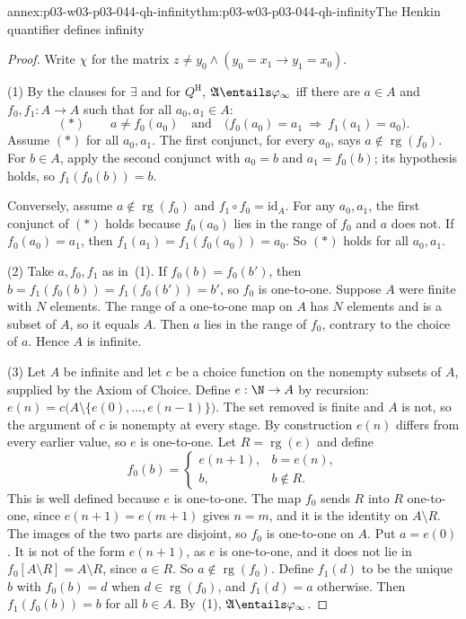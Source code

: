 \begin{annexitem}{annex:p03-w03-p03-044-qh-infinity}{thm:p03-w03-p03-044-qh-infinity}{The Henkin quantifier defines infinity}
\begin{proof}
Write \(\chi\) for the matrix
\(z\neq y_0\land(y_0=x_1\to y_1=x_0)\).

(1) By the clauses for \(\exists\) and for \(Q^{\mathrm H}\),
\(\mathfrak A\entails\varphi_\infty\) iff there are \(a\in A\) and
\(f_0,f_1:A\to A\) such that for all \(a_0,a_1\in A\):
\[
 (\ast)\qquad a\neq f_0(a_0)\quad\text{and}\quad
 \bigl(f_0(a_0)=a_1\ \Rightarrow\ f_1(a_1)=a_0\bigr).
\]
Assume \((\ast)\) for all \(a_0,a_1\).  The first conjunct, for every
\(a_0\), says \(a\notin\operatorname{rg}(f_0)\).  For \(b\in A\), apply
the second conjunct with \(a_0=b\) and \(a_1=f_0(b)\); its hypothesis holds,
so \(f_1(f_0(b))=b\).

Conversely, assume \(a\notin\operatorname{rg}(f_0)\) and \(f_1\circ
f_0=\mathrm{id}_A\).  For any \(a_0,a_1\), the first conjunct of \((\ast)\)
holds because \(f_0(a_0)\) lies in the range of \(f_0\) and \(a\) does not.
If \(f_0(a_0)=a_1\), then \(f_1(a_1)=f_1(f_0(a_0))=a_0\).  So \((\ast)\)
holds for all \(a_0,a_1\).

(2) Take \(a,f_0,f_1\) as in~(1).  If \(f_0(b)=f_0(b')\), then
\(b=f_1(f_0(b))=f_1(f_0(b'))=b'\), so \(f_0\) is one-to-one.  Suppose \(A\)
were finite with \(N\) elements.  The range of a one-to-one map on \(A\) has
\(N\) elements and is a subset of \(A\), so it equals \(A\).  Then \(a\) lies
in the range of \(f_0\), contrary to the choice of \(a\).  Hence \(A\) is
infinite.

(3) Let \(A\) be infinite and let \(c\) be a choice function on the
nonempty subsets of \(A\), supplied by the Axiom of Choice.  Define
\(e:\N\to A\) by recursion:
\(e(n)=c\bigl(A\setminus\{e(0),\ldots,e(n-1)\}\bigr)\).  The set removed is
finite and \(A\) is not, so the argument of \(c\) is nonempty at every
stage.  By construction \(e(n)\) differs from every earlier value, so \(e\)
is one-to-one.  Let \(R=\operatorname{rg}(e)\) and define
\[
 f_0(b)=\begin{cases} e(n+1), & b=e(n),\\ b, & b\notin R.\end{cases}
\]
This is well defined because \(e\) is one-to-one.  The map \(f_0\) sends
\(R\) into \(R\) one-to-one, since \(e(n+1)=e(m+1)\) gives \(n=m\), and it
is the identity on \(A\setminus R\).  The images of the two parts are
disjoint, so \(f_0\) is one-to-one on \(A\).  Put \(a=e(0)\).  It is not of
the form \(e(n+1)\), as \(e\) is one-to-one, and it does not lie in
\(f_0[A\setminus R]=A\setminus R\), since \(a\in R\).  So \(a\notin\operatorname{rg}(f_0)\).  Define \(f_1(d)\) to
be the unique \(b\) with \(f_0(b)=d\) when \(d\in\operatorname{rg}(f_0)\), and
\(f_1(d)=a\) otherwise.  Then \(f_1(f_0(b))=b\) for all \(b\in A\).  By~(1),
\(\mathfrak A\entails\varphi_\infty\).
\end{proof}
\end{annexitem}

